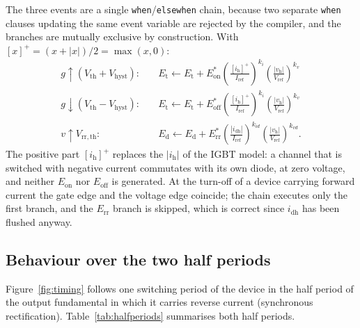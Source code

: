 \documentclass[11pt,a4paper]{article}
\newcommand{\Eon}{E_{\mathrm{on}}}
\newcommand{\Eoff}{E_{\mathrm{off}}}
\newcommand{\Err}{E_{\mathrm{rr}}}
\newcommand{\ih}{i_{\mathrm{h}}}
\newcommand{\idh}{i_{\mathrm{dh}}}
\newcommand{\vh}{v_{\mathrm{h}}}
\newcommand{\code}[1]{\texttt{#1}}
\begin{document}
The three events are a single \code{when}/\code{elsewhen} chain, because two
separate \code{when} clauses updating the same event variable are rejected by
the compiler, and the branches are mutually exclusive by construction. With
$[x]^+ = (x+|x|)/2 = \max(x,0)$:
\begin{align}
g \uparrow (V_\mathrm{th}+V_\mathrm{hyst}):\quad &
E_\mathrm{t} \leftarrow E_\mathrm{t} + \Eon^\ast
\left(\frac{[\ih]^+}{I_\mathrm{ref}}\right)^{k_i}
\left(\frac{|\vh|}{V_\mathrm{ref}}\right)^{k_v}
\label{eq:evon}\\
g \downarrow (V_\mathrm{th}-V_\mathrm{hyst}):\quad &
E_\mathrm{t} \leftarrow E_\mathrm{t} + \Eoff^\ast
\left(\frac{[\ih]^+}{I_\mathrm{ref}}\right)^{k_i}
\left(\frac{|\vh|}{V_\mathrm{ref}}\right)^{k_v}
\label{eq:evoff}\\
v \uparrow V_\mathrm{rr,th}:\quad &
E_\mathrm{d} \leftarrow E_\mathrm{d} + \Err^\ast
\left(\frac{|\idh|}{I_\mathrm{ref}}\right)^{k_{id}}
\left(\frac{|\vh|}{V_\mathrm{ref}}\right)^{k_{vd}}.
\label{eq:everr}
\end{align}
The positive part $[\ih]^+$ replaces the $|\ih|$ of the IGBT model: a channel
that is switched with negative current commutates with its own diode, at
zero voltage, and neither $\Eon$ nor $\Eoff$ is generated. At the turn-off of a
device carrying forward current the gate edge and the voltage edge coincide;
the chain executes only the first branch, and the $\Err$ branch is skipped,
which is correct since $\idh$ has been flushed anyway.

\subsection{Behaviour over the two half periods}

Figure~\ref{fig:timing} follows one switching period of the device in the half
period of the output fundamental in which it carries reverse current
(synchronous rectification). Table~\ref{tab:halfperiods} summarises both half
periods.
\end{document}
